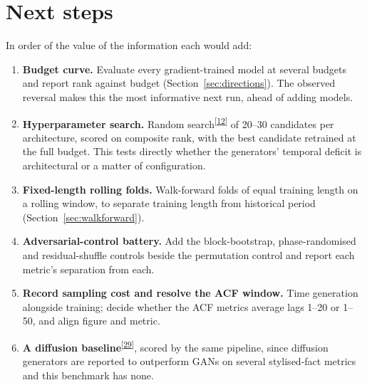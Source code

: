 \documentclass[11pt,a4paper]{article}
\makeatletter
\newcommand{\tcite}[1]{\textsuperscript{[\hyperlink{R:#1}{#1}]}}
\DeclareRobustCommand{\_}{\ifmmode\nfss@text{\textunderscore}\else\textunderscore\allowbreak\fi}
\makeatother
\begin{document}
\section{Next steps}
\label{sec:next}
In order of the value of the information each would add:
\begin{enumerate}
\item \textbf{Budget curve.} Evaluate every gradient-trained model at several budgets and report rank against budget (Section~\ref{sec:directions}). The observed reversal makes this the most informative next run, ahead of adding models.
\item \textbf{Hyperparameter search.} Random search\tcite{12} of 20--30 candidates per architecture, scored on composite rank, with the best candidate retrained at the full budget. This tests directly whether the generators' temporal deficit is architectural or a matter of configuration.
\item \textbf{Fixed-length rolling folds.} Walk-forward folds of equal training length on a rolling window, to separate training length from historical period (Section~\ref{sec:walkforward}).
\item \textbf{Adversarial-control battery.} Add the block-bootstrap, phase-randomised and residual-shuffle controls beside the permutation control and report each metric's separation from each.
\item \textbf{Record sampling cost and resolve the ACF window.} Time generation alongside training; decide whether the ACF metrics average lags 1--20 or 1--50, and align figure and metric.
\item \textbf{A diffusion baseline}\tcite{29}, scored by the same pipeline, since diffusion generators are reported to outperform GANs on several stylised-fact metrics and this benchmark has none.
\end{enumerate}
\clearpage
\end{document}
